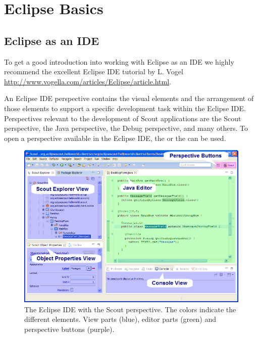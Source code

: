 \documentclass[a4paper,10pt,twoside]{book}
\begin{document}
  \sloppy
\fi


\chapter{Eclipse Basics}

\section{Eclipse as an IDE}

To get a good introduction into working with Eclipse as an IDE we highly recommend the excellent Eclipse IDE tutorial by L. Vogel \url{http://www.vogella.com/articles/Eclipse/article.html}.

An Eclipse IDE perspective contains the visual elements and the arrangement of those elements to support a specific development task within the Eclipse IDE. 
Perspectives relevant to the development of Scout applications are the Scout perspective, the Java perspective, the Debug perspective, and many others. 
To open a perspective available in the Eclipse IDE, the  or the  can be used. 

\begin{figure}
\includegraphics[width=14cm]{eclipse_ide_parts.png} 
\caption{The Eclipse IDE with the Scout perspective. The colors indicate the different elements. View parts (blue), editor parts (green) and perspective buttons (purple). }
\end{figure}
\end{document}
